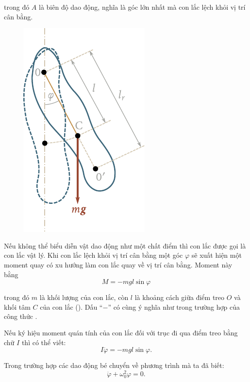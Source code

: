 \noindent
trong đó $A$ là biên độ dao động, nghĩa là góc lớn nhất mà con lắc lệch khỏi vị trí cân bằng.

\begin{figure}[!htb]
	\begin{center}
		\includegraphics[scale=0.9]{figures/ch_07/fig_7_8.pdf}
		\caption[]{}
		\label{fig:7_8}
	\end{center}
\end{figure}

Nếu không thể biểu diễn vật dao động như một chất điểm thì con lắc được gọi là con lắc vật lý. Khi con lắc lệch khỏi vị trí cân bằng một góc $\varphi$ sẽ xuất hiện một moment quay có xu hướng làm con lắc quay về vị trí cân bằng. Moment này bằng
\begin{equation}\label{eq:7_78}
	M = -mgl\sin\varphi
\end{equation}

\noindent
trong đó $m$ là khối lượng của con lắc, còn $l$ là khoảng cách giữa điểm treo $O$ và khối tâm $C$ của con lắc (). Dấu ``$-$'' có cùng ý nghĩa như trong trường hợp của công thức .

Nếu ký hiệu moment quán tính của con lắc đối với trục đi qua điểm treo bằng chữ $I$ thì có thể viết:
\begin{equation}\label{eq:7_79}
	I\ddot{\varphi} = -mgl\sin\varphi.
\end{equation}

\noindent
Trong trường hợp các dao động bé  chuyển về phương trình  mà ta đã biết:
\begin{equation*}
	\ddot{\varphi} +\omega_0^2\varphi = 0.
\end{equation*}

